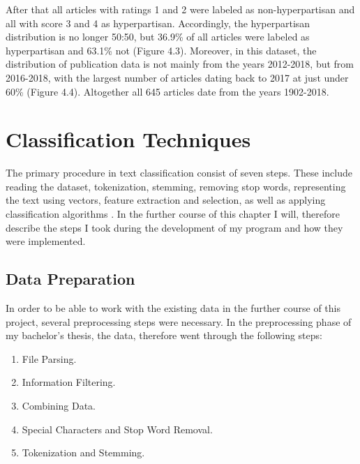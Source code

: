 \documentclass[a4paper, 11pt,titlepage,oneside,openany]{book}
\begin{document}
After that all articles with ratings 1 and 2 were labeled as non-hyperpartisan and all with score 3 and 4 as hyperpartisan.
Accordingly, the hyperpartisan distribution is no longer 50:50, but 36.9\% of all articles were labeled as hyperpartisan and 63.1\% not (Figure 4.3).
\noindent Moreover, in this dataset, the distribution of publication data is not mainly from the years 2012-2018, but from 2016-2018, with the largest number of articles dating back to 2017 at just under 60\% (Figure 4.4). Altogether all 645 articles date from the years 1902-2018.




\chapter{Classification Techniques}
The primary procedure in text classification consist of seven steps. These include  reading the dataset, tokenization, stemming, removing stop words, representing the text using vectors, feature extraction and selection, as well as applying classification algorithms \cite{textclassification}. In the further course of this chapter I  will, therefore describe the steps I took during the development of my program and how they were implemented.

\section{Data Preparation}
In order to be able to work with the existing data in the further course of this project, several preprocessing steps were necessary. In the preprocessing phase of my bachelor's thesis, the data, therefore went through the following steps:
\begin{enumerate}
	\item File Parsing. 
	\item Information Filtering.
	\item Combining Data.
	\item Special Characters and Stop Word Removal.
	\item Tokenization and Stemming.
\end{enumerate}	
\end{document}
